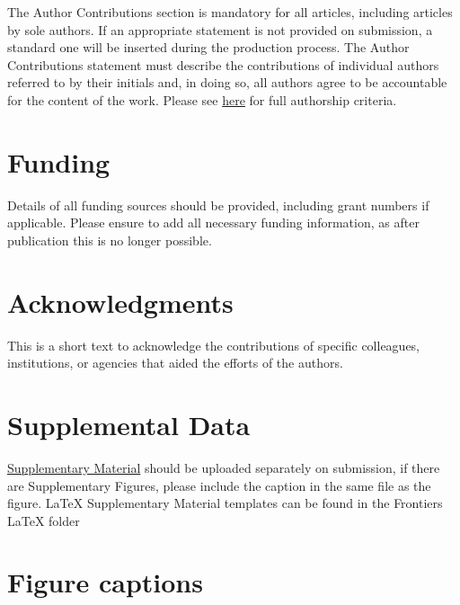 \documentclass[utf8]{frontiersSCNS} %
\begin{document}
The Author Contributions section is mandatory for all articles, including articles by sole authors. If an appropriate statement is not provided on submission, a standard one will be inserted during the production process. The Author Contributions statement must describe the contributions of individual authors referred to by their initials and, in doing so, all authors agree to be accountable for the content of the work. Please see  \href{http://home.frontiersin.org/about/author-guidelines#AuthorandContributors}{here} for full authorship criteria.

\section*{Funding}
Details of all funding sources should be provided, including grant numbers if applicable. Please ensure to add all necessary funding information, as after publication this is no longer possible.

\section*{Acknowledgments}
This is a short text to acknowledge the contributions of specific colleagues, institutions, or agencies that aided the efforts of the authors.

\section*{Supplemental Data}
 \href{http://home.frontiersin.org/about/author-guidelines#SupplementaryMaterial}{Supplementary Material} should be uploaded separately on submission, if there are Supplementary Figures, please include the caption in the same file as the figure. LaTeX Supplementary Material templates can be found in the Frontiers LaTeX folder 





\section*{Figure captions}
\end{document}
